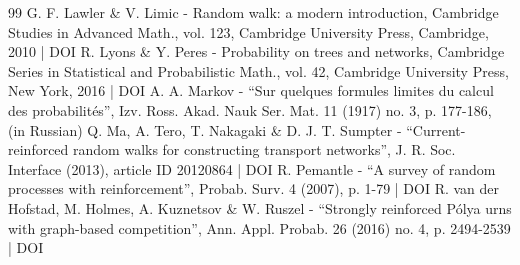 \begin{thebibliography}{99}
G. F. Lawler \& V. Limic - Random walk: a modern introduction, Cambridge Studies in Advanced Math., vol. 123, Cambridge University Press, Cambridge, 2010 | DOI
R. Lyons \& Y. Peres - Probability on trees and networks, Cambridge Series in Statistical and Probabilistic Math., vol. 42, Cambridge University Press, New York, 2016 | DOI
A. A. Markov - “Sur quelques formules limites du calcul des probabilités”, Izv. Ross. Akad. Nauk Ser. Mat. 11 (1917) no. 3, p. 177-186, (in Russian)
Q. Ma, A. Tero, T. Nakagaki \& D. J. T. Sumpter - “Current-reinforced random walks for constructing transport networks”, J. R. Soc. Interface (2013), article ID 20120864 | DOI
R. Pemantle - “A survey of random processes with reinforcement”, Probab. Surv. 4 (2007), p. 1-79 | DOI
R. van der Hofstad, M. Holmes, A. Kuznetsov \& W. Ruszel - “Strongly reinforced Pólya urns with graph-based competition”, Ann. Appl. Probab. 26 (2016) no. 4, p. 2494-2539 | DOI
\end{thebibliography}
